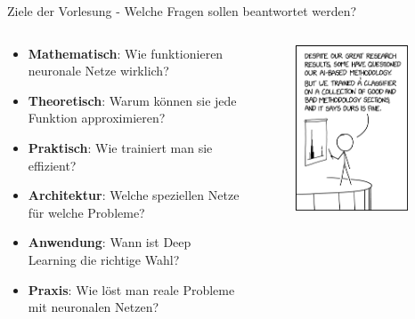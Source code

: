 \documentclass[aspectratio=1610, xcolor=dvipsnames, 9pt]{beamer}
\begin{document}
\begin{frame}{Ziele der Vorlesung - Welche Fragen sollen beantwortet werden?}
  \begin{columns}
    \begin{column}{0.69\textwidth}
      \begin{itemize}
        \item \textbf{Mathematisch}: Wie funktionieren neuronale Netze wirklich? \newline
        \item \textbf{Theoretisch}: Warum können sie jede Funktion approximieren? \newline
        \item \textbf{Praktisch}: Wie trainiert man sie effizient? \newline
        \item \textbf{Architektur}: Welche speziellen Netze für welche Probleme? \newline
        \item \textbf{Anwendung}: Wann ist Deep Learning die richtige Wahl? \newline
        \item \textbf{Praxis}: Wie löst man reale Probleme mit neuronalen Netzen? \newline
      \end{itemize}
    \end{column}
    \begin{column}{0.3\textwidth}
 \begin{figure}
 \centering
             \includegraphics[width=0.9\textwidth]{images/ai_methodology.png}

\end{figure}
\end{column}
\end{columns}
\end{frame}
\end{document}
